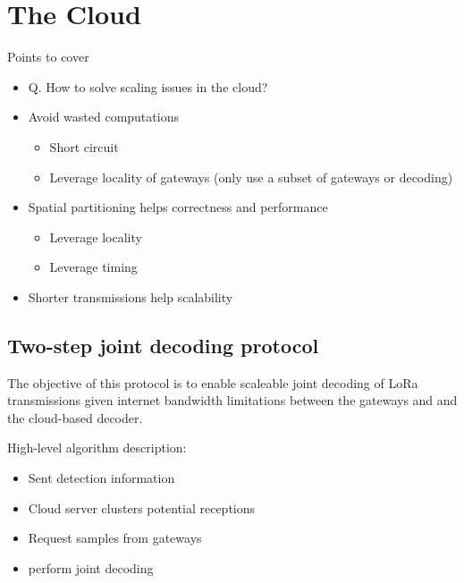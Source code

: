 \section{The Cloud}
\label{sec:cloud}

{\color{blue}
Points to cover
\begin{itemize} 
    \item Q. How to solve scaling issues in the cloud?
    \item Avoid wasted computations
        \begin{itemize}
            \item Short circuit
            \item Leverage locality of gateways (only use a subset of gateways  or decoding)
        \end{itemize}
    \item Spatial partitioning helps correctness and performance
        \begin{itemize}
            \item Leverage locality
            \item Leverage timing
        \end{itemize}
    \item Shorter transmissions help scalability
\end{itemize}
}

\subsection{Two-step joint decoding protocol}

The objective of this protocol is to enable scaleable joint decoding of LoRa
transmissions given internet bandwidth limitations between the gateways and
and the cloud-based decoder.

{\color{blue} High-level algorithm description:
\begin{itemize}
    \item Sent detection information
    \item Cloud server clusters potential receptions
    \item Request samples from gateways
    \item perform joint decoding
\end{itemize}
}